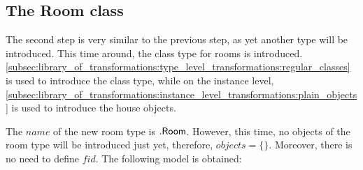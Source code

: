 \subsection{The Room class}
\label{subsec:application:building_the_model:the_room_class}

The second step is very similar to the previous step, as yet another type will be introduced. This time around, the class type for rooms is introduced. \cref{subsec:library_of_transformations:type_level_transformations:regular_classes} is used to introduce the class type, while on the instance level, \cref{subsec:library_of_transformations:instance_level_transformations:plain_objects} is used to introduce the house objects.

The $name$ of the new room type is $.\mathsf{Room}$. However, this time, no objects of the room type will be introduced just yet, therefore, $objects = \{\}$. Moreover, there is no need to define $fid$. The following model is obtained:


